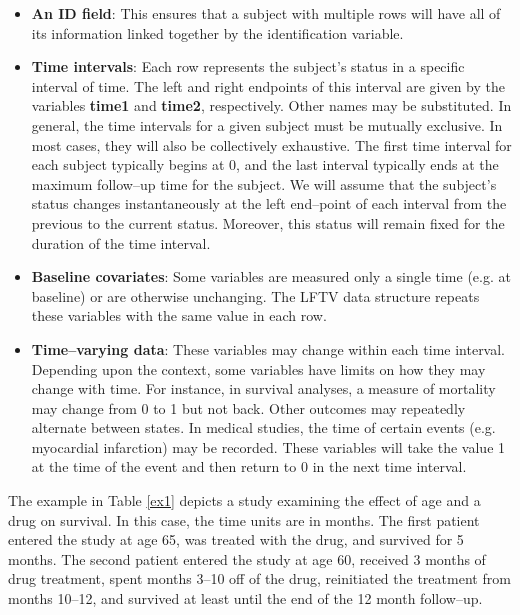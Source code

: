 \documentclass{article}
\begin{document}
\begin{itemize}
\item \textbf{An ID field}:  This ensures that a subject with multiple rows will have all of its information linked together by the identification variable.

\item \textbf{Time intervals}:  Each row represents the subject's status in a specific interval of time.  The left and right endpoints of this interval are given by the variables \textbf{time1} and \textbf{time2}, respectively.  Other names may be substituted.  In general, the time intervals for a given subject must be mutually exclusive.  In most cases, they will also be collectively exhaustive.  The first time interval for each subject typically begins at 0, and the last interval typically ends at the maximum follow--up time for the subject.  We will assume that the subject's status changes instantaneously at the left end--point of each interval from the previous to the current status.  Moreover, this status will remain fixed for the duration of the time interval.

\item \textbf{Baseline covariates}:  Some variables are measured only a single time (e.g. at baseline) or are otherwise unchanging.  The LFTV data structure repeats these variables with the same value in each row.

\item \textbf{Time--varying data}:  These variables may change within each time interval.  Depending upon the context, some variables have limits on how they may change with time.  For instance, in survival analyses, a measure of mortality may change from 0 to 1 but not back.  Other outcomes may repeatedly alternate between states.  In medical studies, the time of certain events (e.g. myocardial infarction) may be recorded.  These variables will take the value 1 at the time of the event and then return to 0 in the next time interval.

\end{itemize}

\noindent The example in Table \ref{ex1} depicts a study examining the effect of age and a drug on survival.  In this case, the time units are in months.  The first patient entered the study at age 65, was treated with the drug, and survived for 5 months.  The second patient entered the study at age 60, received 3 months of drug treatment, spent months 3--10 off of the drug, reinitiated the treatment from months 10--12, and survived at least until the end of the 12 month follow--up.\\
\end{document}
